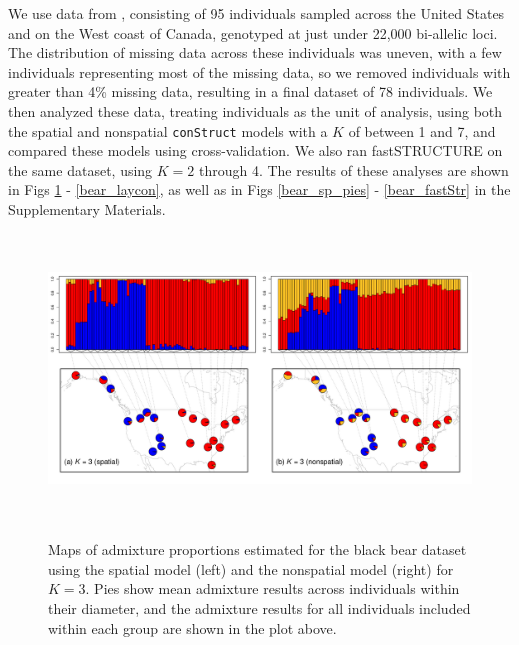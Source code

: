 \documentclass[10pt,letterpaper]{article}
\begin{document}
We use data from \cite{Puckett2015}, consisting of 95 individuals 
sampled across the United States and on the West coast of Canada,
genotyped at just under 22,000 bi-allelic loci.
The distribution of missing data across these individuals was uneven, 
with a few individuals representing most of the missing data, 
so we removed individuals with greater than 4\% missing data, 
resulting in a final dataset of 78 individuals.
We then analyzed these data, treating individuals as the unit of analysis, 
using both the spatial and nonspatial \texttt{conStruct} models with a $K$ of between 1 and 7, 
and compared these models using cross-validation.
We also ran fastSTRUCTURE \cite{fastStructure} on the same dataset, 
using $K = 2$ through 4.
The results of these analyses are shown in Figs \ref{bear_K3} - \ref{bear_laycon}, 
as well as in Figs \ref{bear_sp_pies} - \ref{bear_fastStr} in the Supplementary Materials.

\begin{figure}
	\centering
		{\includegraphics[width=6in,height=3in]{figs/bears/bears_sp_vs_nsp.pdf}}
	\caption{
	Maps of admixture proportions estimated for the black bear dataset 
	using the spatial model (left) and the nonspatial model (right) for $K=3$.
	Pies show mean admixture results across individuals within their diameter, 
	and the admixture results for all individuals included within each group are 
	shown in the plot above.
    }\label{bear_K3}
\end{figure}
\end{document}
